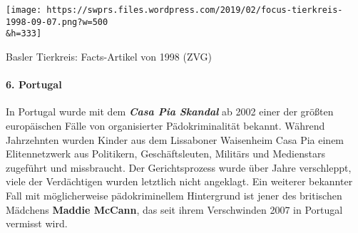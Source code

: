 \texttt{[image: https://swprs.files.wordpress.com/2019/02/focus-tierkreis-1998-09-07.png?w=500\\\&h=333]}

Basler Tierkreis: Facts-Artikel von 1998 (ZVG)

\hypertarget{6-portugal}{%
\paragraph{6. Portugal}\label{6-portugal}}

In Portugal wurde mit dem \emph{\textbf{Casa Pia Skandal}} ab 2002 einer
der größten europäischen Fälle von organisierter Pädokriminalität
bekannt. Während Jahrzehnten wurden Kinder aus dem Lissaboner Waisenheim
Casa Pia einem Elitennetzwerk aus Politikern, Geschäftsleuten, Militärs
und Medienstars zugeführt und missbraucht. Der Gerichtsprozess wurde
über Jahre verschleppt, viele der Verdächtigen wurden letztlich nicht
angeklagt. Ein weiterer bekannter Fall mit möglicherweise
pädokriminellem Hintergrund ist jener des britischen Mädchens
\textbf{Maddie McCann}, das seit ihrem Verschwinden 2007 in Portugal
vermisst wird.

